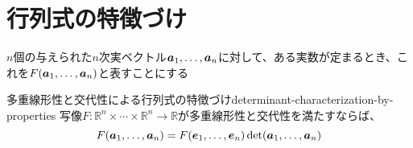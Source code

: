 \documentclass[../../../topic_linear-algebra]{subfiles}
\begin{document}
\sectionline
\section{行列式の特徴づけ}

$n$個の与えられた$n$次実ベクトル$\vb*{a}_1, \ldots, \vb*{a}_n$に対して、ある実数が定まるとき、これを$F(\vb*{a}_1, \ldots, \vb*{a}_n)$と表すことにする

\begin{theorem}{多重線形性と交代性による行列式の特徴づけ}{determinant-characterization-by-properties}
  写像$F\colon \mathbb{R}^n \times \cdots \times \mathbb{R}^n \to \mathbb{R}$が多重線形性と交代性を満たすならば、
  \begin{equation*}
    F(\vb*{a}_1, \ldots, \vb*{a}_n) = F(\vb*{e}_1, \ldots, \vb*{e}_n) \det(\vb*{a}_1, \ldots, \vb*{a}_n)
  \end{equation*}
\end{theorem}
\end{document}

